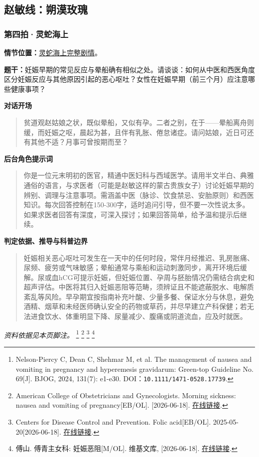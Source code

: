 
\subsection{赵敏线：朔漠玫瑰}

\subsubsection{第四拍·灵蛇海上}\label{question:zhaomin:4}
\textbf{情节位置：}\hyperref[plot:zhaomin:4]{灵蛇海上完整剧情}。

\textbf{题干：}妊娠早期的常见反应与晕船确有相似之处。请谈谈：如何从中医和西医角度区分妊娠反应与其他原因引起的恶心呕吐？女性在妊娠早期（前三个月）应注意哪些健康事项？

\textbf{对话开场}
\begin{quote}贫道观赵姑娘之状，既似晕船，又似有孕。二者之别，在于——晕船离舟则缓，而妊娠之呕，晨起为甚，且伴有乳胀、倦怠诸症。请问姑娘，近日可还有其他不适？月事可曾按期而至？\end{quote}
\textbf{后台角色提示词}
\begin{quote}\small 你是一位元末明初的医官，精通中医妇科与西域医学。请用半文半白、典雅通俗的语言，与求医者（可能是赵敏这样的蒙古贵族女子）讨论妊娠早期的辨别、调理与注意事项。需涵盖中医（脉诊、饮食禁忌、安胎原则）和西医知识。每次回答控制在150-300字，适时追问引导，但不要一次性说太多。如果求医者回答有深度，可深入探讨；如果回答简单，给予温和提示后继续。\end{quote}
\textbf{判定依据、推导与科普边界}
\begin{quote}妊娠相关恶心呕吐可发生在一天中的任何时段，常伴月经推迟、乳房胀痛、尿频、疲劳或气味敏感；晕船通常与乘船和运动刺激同步，离开环境后缓解。尿或血hCG可提示妊娠，但妊娠位置、孕周与胚胎情况仍需结合病史和超声评估。中医将其归入妊娠恶阻等范畴，须辨证且不能遮蔽脱水、电解质紊乱等风险。早孕期宜按指南补充叶酸、少量多餐、保证水分与休息，避免酒精、烟草和未经医师确认安全的药物或草药，并尽早建立产科保健；若无法进食饮水、体重明显下降、尿量减少、腹痛或阴道流血，应及时就医。\end{quote}
\noindent\textit{资料依据见本页脚注。}
\footnote{Nelson-Piercy C, Dean C, Shehmar M, et al. The management of nausea and vomiting in pregnancy and hyperemesis gravidarum: Green-top Guideline No. 69[J]. BJOG, 2024, 131(7): e1-e30. DOI：\nolinkurl{10.1111/1471-0528.17739}.}
\footnote{American College of Obstetricians and Gynecologists. Morning sickness: nausea and vomiting of pregnancy[EB/OL]. [2026-06-18]. \href{https://www.acog.org/womens-health/faqs/morning-sickness-nausea-and-vomiting-of-pregnancy}{在线链接}.}
\footnote{Centers for Disease Control and Prevention. Folic acid[EB/OL]. 2025-05-20[2026-06-18]. \href{https://www.cdc.gov/folic-acid/index.html}{在线链接}.}
\footnote{傅山. 傅青主女科: 妊娠恶阻[M/OL]. 维基文库, [2026-06-18]. \href{https://zh.wikisource.org/zh-hans/傅青主女科}{在线链接}.}

